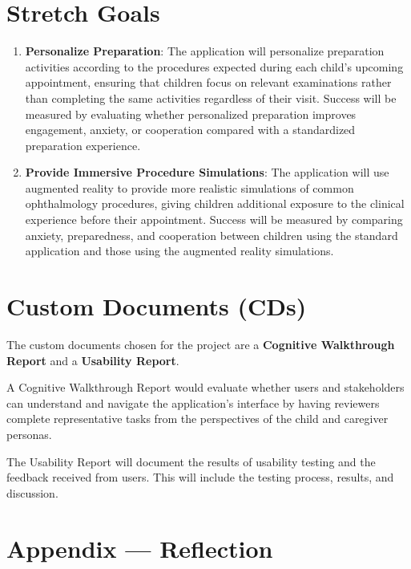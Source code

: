 \documentclass{article}
\begin{document}
\section{Stretch Goals}

\begin{enumerate}
    \item \textbf{Personalize Preparation}: The application will personalize preparation 
    activities according to the procedures expected during each child's upcoming appointment, 
    ensuring that children focus on relevant examinations rather than completing the same activities 
    regardless of their visit. Success will be measured by evaluating whether personalized preparation 
    improves engagement, anxiety, or cooperation compared with a standardized preparation experience.

    \item \textbf{Provide Immersive Procedure Simulations}: The application will use augmented reality 
    to provide more realistic simulations of common ophthalmology procedures, giving children additional 
    exposure to the clinical experience before their appointment. Success will be measured by comparing 
    anxiety, preparedness, and cooperation between children using the standard application and those using 
    the augmented reality simulations.
\end{enumerate}
\section{Custom Documents (CDs)}

The custom documents chosen for the project are a \textbf{Cognitive Walkthrough Report} and a \textbf{Usability Report}.

A Cognitive Walkthrough Report would evaluate whether users and stakeholders can understand and navigate the application's 
interface by having reviewers complete representative tasks from the perspectives of the child and caregiver personas.

The Usability Report will document the results of usability testing and the feedback received from users.
This will include the testing process, results, and discussion.

\newpage{}
\setlength{\parskip}{0.8em}
\setlength{\parindent}{0pt}

\section{Appendix --- Reflection}
\end{document}
